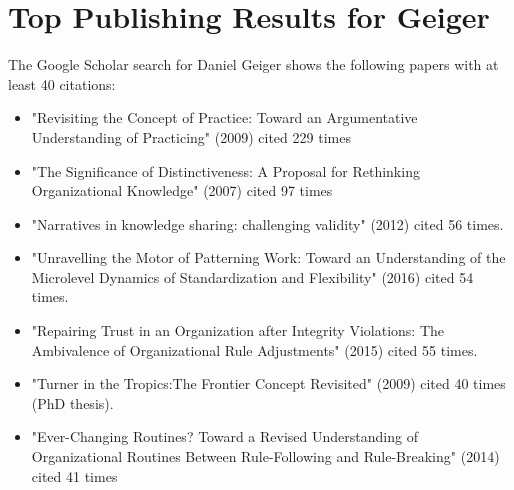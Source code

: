 \section{Top Publishing Results for Geiger}


The Google Scholar search for Daniel Geiger shows the following papers with at least 40 citations:\\

\begin{itemize}
\item "Revisiting the Concept of Practice: Toward an Argumentative Understanding of Practicing" (2009) cited 229 times
\item "The Significance of Distinctiveness: A Proposal for Rethinking Organizational Knowledge" (2007) cited 97 times
\item "Narratives in knowledge sharing: challenging validity" (2012) cited 56 times.
\item "Unravelling the Motor of Patterning Work: Toward an Understanding of the Microlevel Dynamics of Standardization and Flexibility" (2016) cited 54 times.
\item "Repairing Trust in an Organization after Integrity Violations: The Ambivalence of Organizational Rule Adjustments" (2015) cited 55 times.
\item "Turner in the Tropics:The Frontier Concept Revisited" (2009) cited 40 times (PhD thesis).
\item "Ever-Changing Routines? Toward a Revised Understanding of Organizational Routines Between Rule-Following and Rule-Breaking" (2014) cited 41 times
\end{itemize}